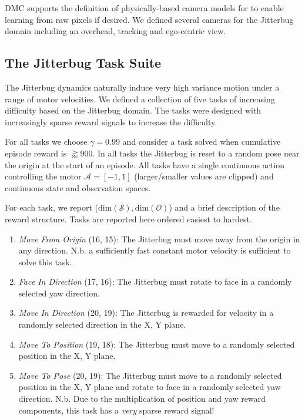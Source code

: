\documentclass[letterpaper, 10 pt, conference]{ieeeconf}
\begin{document}
DMC supports the definition of physically-based camera models for to enable learning from raw pixels if desired.
We defined several cameras for the Jitterbug domain including an overhead, tracking and ego-centric view.

\subsection{The Jitterbug Task Suite}

The Jitterbug dynamics naturally induce very high variance motion under a range of motor velocities.
We defined a collection of five tasks of increasing difficulty based on the Jitterbug domain.
The tasks were designed with increasingly sparse reward signals to increase the difficulty.

For all tasks we choose $\gamma = 0.99$ and consider a task solved when cumulative episode reward is $\gtrapprox 900$.
In all tasks the Jitterbug is reset to a random pose near the origin at the start of an episode.
All tasks have a single continuous action controlling the motor $\mathcal{A} = [-1, 1]$ (larger/smaller values are clipped) and continuous state and observation spaces.

For each task, we report ($\text{dim}(\mathcal{S}), \text{dim}(\mathcal{O})$) and a brief description of the reward structure.
Tasks are reported here ordered easiest to hardest.

\begin{enumerate}
    
    \item \emph{Move From Origin} (16, 15): The Jitterbug must move away from the origin in any direction.
    N.b. a sufficiently fast constant motor velocity is sufficient to solve this task.
    
    \item \emph{Face In Direction} (17, 16): The Jitterbug must rotate to face in a randomly selected yaw direction.
    
    \item \emph{Move In Direction} (20, 19): The Jitterbug is rewarded for velocity in a randomly selected direction in the X, Y plane.
    
    \item \emph{Move To Position} (19, 18): The Jitterbug must move to a randomly selected position in the X, Y plane.
    
    \item \emph{Move To Pose} (20, 19): The Jitterbug must move to a randomly selected position in the X, Y plane and rotate to face in a randomly selected yaw direction.
    N.b. Due to the multiplication of position and yaw reward components, this task has a \emph{very} sparse reward signal!
    
\end{enumerate}
\end{document}
